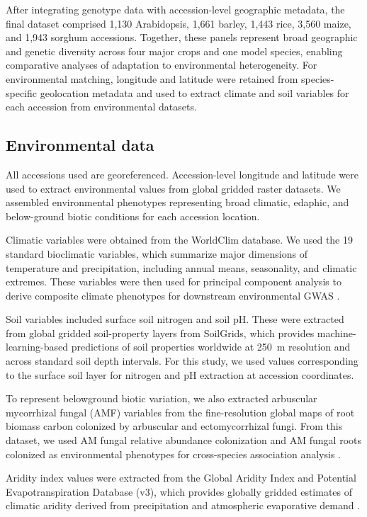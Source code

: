 \documentclass[unnumsec,webpdf,contemporary,large]{oup-authoring-template}%
\theoremstyle{thmstyleone}%
\theoremstyle{thmstyletwo}%
\theoremstyle{thmstylethree}%
\begin{document}
After integrating genotype data with accession-level geographic metadata, the final dataset comprised 1,130 Arabidopsis, 1,661 barley, 1,443 rice, 3,560 maize, and 1,943 sorghum accessions. Together, these panels represent broad geographic and genetic diversity across four major crops and one model species, enabling comparative analyses of adaptation to environmental heterogeneity. For environmental matching, longitude and latitude were retained from species-specific geolocation metadata and used to extract climate and soil variables for each accession from environmental datasets.

\subsection{Environmental data}
All accessions used are georeferenced. Accession-level longitude and latitude were used to extract environmental values from global gridded raster datasets. We assembled environmental phenotypes representing broad climatic, edaphic, and below-ground biotic conditions for each accession location.

Climatic variables were obtained from the WorldClim database. We used the 19 standard bioclimatic variables, which summarize major dimensions of temperature and precipitation, including annual means, seasonality, and climatic extremes. These variables were then used for principal component analysis to derive composite climate phenotypes for downstream environmental GWAS \citep{fick2017worldclim}.

Soil variables included surface soil nitrogen and soil pH. These were extracted from global gridded soil-property layers from SoilGrids, which provides machine-learning-based predictions of soil properties worldwide at 250~m resolution and across standard soil depth intervals. For this study, we used values corresponding to the surface soil layer for nitrogen and pH extraction at accession coordinates. \citep{poggio2021soilgrids} 

To represent belowground biotic variation, we also extracted arbuscular mycorrhizal fungal (AMF) variables from the fine-resolution global maps of root biomass carbon colonized by arbuscular and ectomycorrhizal fungi. From this dataset, we used AM fungal relative abundance colonization and AM fungal roots colonized as environmental phenotypes for cross-species association analysis \citep{barcelo2023amf}. 

Aridity index values were extracted from the Global Aridity Index and Potential Evapotranspiration Database (v3), which provides globally gridded estimates of climatic aridity derived from precipitation and atmospheric evaporative demand \citep{zomer2022aridity}.
\end{document}
